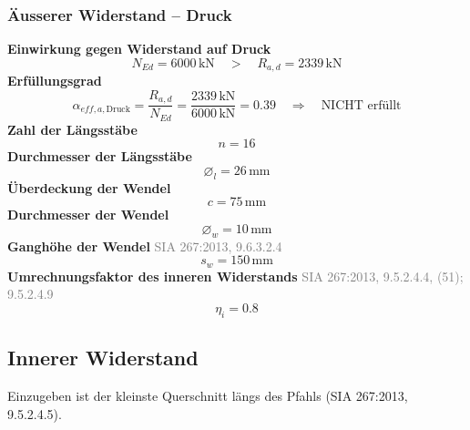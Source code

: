 \documentclass[11pt,a4paper]{article}
\newcommand{\normref}[1]{{\small\textcolor{gray}{#1}}}
\begin{document}
\subsubsection{Äusserer Widerstand – Druck}
\noindent\textbf{Einwirkung gegen Widerstand auf Druck}
\begin{equation*}
N_{Ed} = 6000\,\mathrm{kN} \quad > \quad R_{a,d} = 2339\,\mathrm{kN}
\end{equation*}
\noindent\textbf{Erfüllungsgrad}
\begin{equation*}
\alpha_{eff,a,\text{Druck}} = \frac{R_{a,d}}{N_{Ed}} = \frac{2339\,\mathrm{kN}}{6000\,\mathrm{kN}} = 0.39 \quad \Rightarrow \quad \text{NICHT erfüllt}
\end{equation*}
\noindent\textbf{Zahl der Längsstäbe}
\begin{equation*}
n = 16
\end{equation*}
\noindent\textbf{Durchmesser der Längsstäbe}
\begin{equation*}
\varnothing_l = 26\,\mathrm{mm}
\end{equation*}
\noindent\textbf{Überdeckung der Wendel}
\begin{equation*}
c = 75\,\mathrm{mm}
\end{equation*}
\noindent\textbf{Durchmesser der Wendel}
\begin{equation*}
\varnothing_w = 10\,\mathrm{mm}
\end{equation*}
\noindent\textbf{Ganghöhe der Wendel} \hfill \normref{SIA 267:2013, 9.6.3.2.4}
\begin{equation*}
s_w = 150\,\mathrm{mm}
\end{equation*}
\noindent\textbf{Umrechnungsfaktor des inneren Widerstands} \hfill \normref{SIA 267:2013, 9.5.2.4.4, (51); 9.5.2.4.9}
\begin{equation*}
\eta_i = 0.8
\end{equation*}
\subsection{Innerer Widerstand}
Einzugeben ist der kleinste Querschnitt längs des Pfahls (SIA 267:2013, 9.5.2.4.5).
\end{document}

